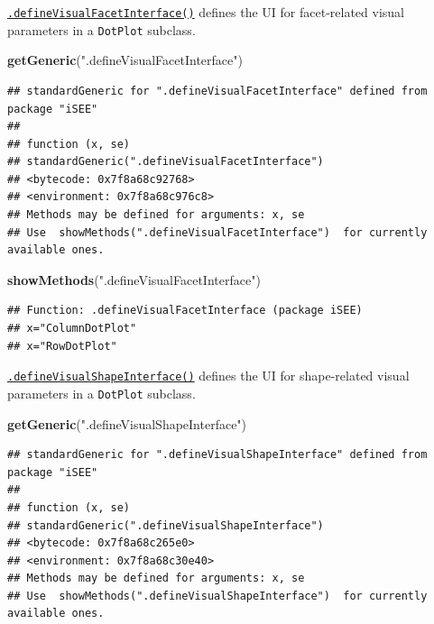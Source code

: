 \documentclass[
]{book}
\newenvironment{Shaded}{\begin{snugshade}}{\end{snugshade}}
\newcommand{\KeywordTok}[1]{\textcolor[rgb]{0.13,0.29,0.53}{\textbf{#1}}}
\newcommand{\NormalTok}[1]{#1}
\newcommand{\StringTok}[1]{\textcolor[rgb]{0.31,0.60,0.02}{#1}}
\begin{document}
\href{https://isee.github.io/iSEE/reference/visual-parameters-generics.html}{\texttt{.defineVisualFacetInterface()}} defines the UI for facet-related visual parameters in a \texttt{DotPlot} subclass.

\begin{Shaded}
\begin{Highlighting}[]
\KeywordTok{getGeneric}\NormalTok{(}\StringTok{".defineVisualFacetInterface"}\NormalTok{)}
\end{Highlighting}
\end{Shaded}

\begin{verbatim}
## standardGeneric for ".defineVisualFacetInterface" defined from package "iSEE"
## 
## function (x, se) 
## standardGeneric(".defineVisualFacetInterface")
## <bytecode: 0x7f8a68c92768>
## <environment: 0x7f8a68c976c8>
## Methods may be defined for arguments: x, se
## Use  showMethods(".defineVisualFacetInterface")  for currently available ones.
\end{verbatim}

\begin{Shaded}
\begin{Highlighting}[]
\KeywordTok{showMethods}\NormalTok{(}\StringTok{".defineVisualFacetInterface"}\NormalTok{)}
\end{Highlighting}
\end{Shaded}

\begin{verbatim}
## Function: .defineVisualFacetInterface (package iSEE)
## x="ColumnDotPlot"
## x="RowDotPlot"
\end{verbatim}

\href{https://isee.github.io/iSEE/reference/visual-parameters-generics.html}{\texttt{.defineVisualShapeInterface()}} defines the UI for shape-related visual parameters in a \texttt{DotPlot} subclass.

\begin{Shaded}
\begin{Highlighting}[]
\KeywordTok{getGeneric}\NormalTok{(}\StringTok{".defineVisualShapeInterface"}\NormalTok{)}
\end{Highlighting}
\end{Shaded}

\begin{verbatim}
## standardGeneric for ".defineVisualShapeInterface" defined from package "iSEE"
## 
## function (x, se) 
## standardGeneric(".defineVisualShapeInterface")
## <bytecode: 0x7f8a68c265e0>
## <environment: 0x7f8a68c30e40>
## Methods may be defined for arguments: x, se
## Use  showMethods(".defineVisualShapeInterface")  for currently available ones.
\end{verbatim}
\end{document}

